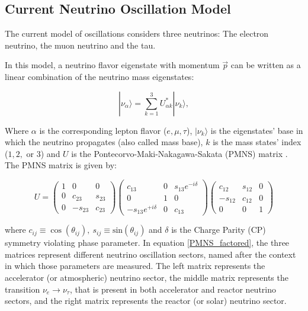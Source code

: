 \subsection{Current Neutrino Oscillation Model}

The current model of oscillations considers three neutrinos: The electron neutrino, the muon neutrino and the tau.

In this model, a neutrino flavor eigenstate with momentum $\vec{p}$ can be written as a linear combination of the neutrino mass eigenstates:

\begin{equation}
	|\nu_\alpha \rangle = \sum_{k=1}^3 U^*_{\alpha k} |\nu_k \rangle,
	\label{nu_state}
\end{equation}
 
Where $\alpha$ is the corresponding lepton flavor ($e, \mu, \tau$), $|\nu_k\rangle$ is the eigenstates' base in which the neutrino propagates (also called mass base), $k$ is the mass states' index ($1, 2,$ or $3$) and $U$ is the Pontecorvo-Maki-Nakagawa-Sakata (PMNS) matrix \cite{MNS, PMNS}. The PMNS matrix is given by:
 
\begin{equation}
	U = \left( \begin{array}{ccc} 
	1 & 0 & 0 \\ 
	0 & c_{23} & s_{23} \\
	0 & -s_{23} & c_{23} \end{array} \right)
	\left(\begin{array}{ccc} 
	c_{13} & 0 & s_{13}e^{-i\delta} \\ 
	0 & 1 & 0 \\ 
	-s_{13}e^{+i\delta} & 0 & c_{13} \end{array}\right)
	\left(\begin{array}{ccc}
	c_{12} & s_{12} & 0 \\ 
	-s_{12} & c_{12} & 0 \\ 
	0 & 0 & 1 \end{array} \right)
	\label{PMNS_factored}
\end{equation}
 
where $c_{ij} \equiv \cos(\theta_{ij}), \ s_{ij} \equiv \text{sin}(\theta_{ij})$ and $\delta$ is the Charge Parity (CP) symmetry violating phase parameter.
In equation \ref{PMNS_factored}, the three matrices represent different neutrino oscillation sectors, named after the context in which those parameters are measured. The left matrix represents the accelerator (or atmospheric) neutrino sector, the middle matrix represents the transition $\nu_e \rightarrow \nu_\tau$, that is present in both accelerator and reactor neutrino sectors, and the right matrix represents the reactor (or solar) neutrino sector.
 
